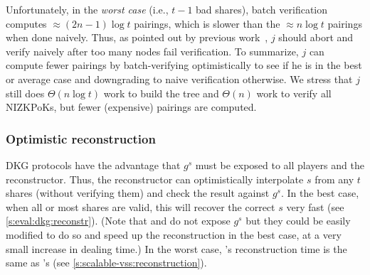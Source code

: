 Unfortunately, in the \textit{worst case} (i.e., $t-1$ bad shares), batch verification computes $\approx(2n-1)\log{t}$ pairings, which is slower than the $\approx n\log{t}$ pairings when done naively.
Thus, as pointed out by previous work~\cite{LM07}, $j$ should abort and verify naively after too many nodes fail verification.
To summarize, $j$ can compute fewer pairings by batch-verifying optimistically to see if he is in the best or average case and downgrading to naive verification otherwise.
We stress that $j$ still does $\Theta(n\log{t})$ work to build the tree and $\Theta(n)$ work to verify all NIZKPoKs, but fewer (expensive) pairings are computed.

\subsubsection{Optimistic reconstruction}
\label{s:scalable-dkg:reconstr}

DKG protocols have the advantage that $g^s$ must be exposed to all players and the reconstructor.
Thus, the reconstructor can optimistically interpolate $s$ from any $t$ shares (without verifying them) and check the result against $g^s$.
In the best case, when all or most shares are valid, this will recover the correct $s$ very fast (see \cref{s:eval:dkg:reconstr}).
(Note that \ourvss and \evss do not expose $g^s$ but they could be easily modified to do so and speed up the reconstruction in the best case, at a very small increase in dealing time.)
In the worst case, \ourdkg's reconstruction time is the same as \ourvss's (see \cref{s:scalable-vss:reconstruction}).